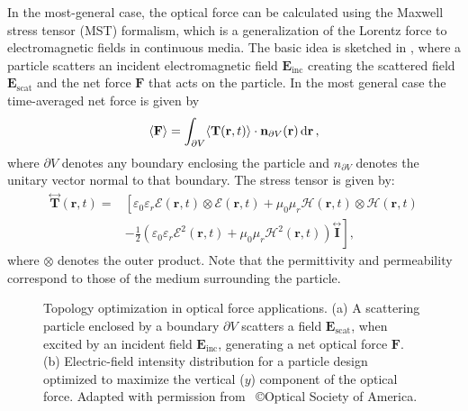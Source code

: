 In the most-general case, the optical force can be calculated using the Maxwell stress tensor (MST) formalism, which is a generalization of the Lorentz force to electromagnetic fields in continuous media.
The basic idea is sketched in , where
a particle scatters an incident electromagnetic field $\mathbf{E}_\text{inc}$ creating the scattered field $\mathbf{E}_\text{scat}$ and the net force $\mathbf{F}$ that acts
on the particle. In the most general case the time-averaged net force is given by
\begin{equation}
    \langle\mathbf{F}\rangle=\int_{\partial V}\langle\mathbf{T}(\mathbf{r}, t)\rangle \cdot \mathbf{n}_{\partial V}(\mathbf{r}) \mathop{}\!\text{d} \mathbf{r}\,,
\end{equation}
where $\partial V$ denotes any boundary enclosing the particle and $n_{\partial V}$ denotes the unitary vector normal to that boundary.
The stress tensor is given by:
\begin{equation}
    \begin{aligned}
    \stackrel{\leftrightarrow}{\mathbf{T}}(\mathbf{r}, t)= & {\left[\varepsilon_0 \varepsilon_r \mathcal{E}(\mathbf{r}, t) \otimes \mathcal{E}(\mathbf{r}, t)+\mu_0 \mu_r \mathcal{H}(\mathbf{r}, t) \otimes \mathcal{H}(\mathbf{r}, t)\right.} \\
    & \left.-\frac{1}{2}\left(\varepsilon_0 \varepsilon_r \mathcal{E}^2(\mathbf{r}, t)+\mu_0 \mu_r \mathcal{H}^2(\mathbf{r}, t)\right) \stackrel{\leftrightarrow}{\mathbf{I}}\right],
    \end{aligned}
\end{equation}
where $\otimes$ denotes the outer product. Note that the permittivity and permeability correspond to those of the medium surrounding the particle.

\begin{figure}[tb]
    \centering
    \caption{Topology optimization in optical force applications. (a) A scattering particle 
    enclosed by a boundary $\partial V$ scatters a field $\mathbf{E}_\text{scat}$, when excited by an incident field $\mathbf{E}_\text{inc}$, 
    generating a net optical force $\mathbf{F}$. (b) Electric-field intensity distribution for a particle design optimized to maximize the vertical ($y$)
    component of the optical force. Adapted with permission from~\cite{ownpub2} \copyright Optical Society of America.}
    \label{fig:eng_res}
\end{figure}

